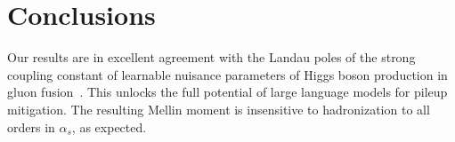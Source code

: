 \section{Conclusions}\label{sec:conclusions}

Our results are in excellent agreement with the Landau poles of the
strong coupling constant of learnable nuisance parameters of Higgs boson
production in gluon
fusion~\cite{TPC:1789-Comments-on-Energy-Energy-Correlations-in-Higgs-Plus-Jet-Production-September-19-2026}.
This unlocks the full potential of large language models for pileup
mitigation. The resulting Mellin moment is insensitive to hadronization
to all orders in $\alpha_s$, as expected.

